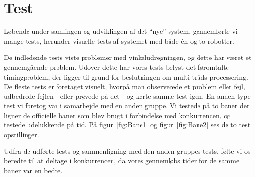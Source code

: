 \section{Test}
Løbende under samlingen og udviklingen af det "`nye"' system, gennemførte vi mange tests, herunder visuelle tests af systemet med både én og to robotter.

De indledende tests viste problemer med vinkeludregningen, og dette har været et gennemgående problem. Udover dette har vores tests belyst det føromtalte timingproblem, der ligger til grund for beslutningen om multi-tråds processering. De fleste tests er foretaget visuelt, hvorpå man observerede et problem eller fejl, udbedrede fejlen - eller prøvede på det - og kørte samme test igen.
En anden type test vi foretog var i samarbejde med en anden gruppe. Vi testede på to baner der ligner de officielle baner som blev brugt i forbindelse med konkurrencen, og testede udelukkende på tid. På figur~\vref{fig:Bane1} og figur~\vref{fig:Bane2} ses de to test opstillinger.


Udfra de udførte tests og sammenligning med den anden gruppes tests, følte vi os beredte til at deltage i konkurrencen, da vores gennemløbs tider for de samme baner var en bedre.
